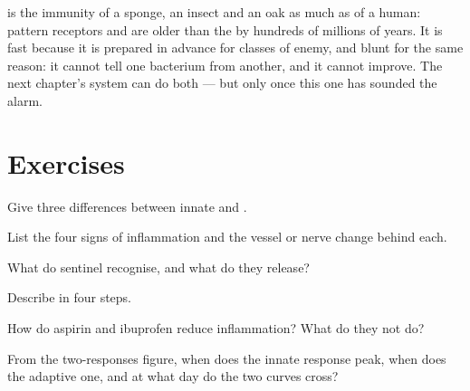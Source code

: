 \begin{remark}\label{rem:g12:innate-immunity:old}
 is the immunity of a sponge, an insect and an oak as
much as of a human: pattern receptors and  are older than
the  by hundreds of millions of years. It is fast because
it is prepared in advance for classes of enemy, and blunt for the
same reason: it cannot tell one bacterium from another, and it cannot
improve. The next chapter's system can do both --- but only once this
one has sounded the alarm.
\end{remark}

\section{Exercises}

\begin{exercise}[$\star$]\label{exo:g12:innate-immunity:1}
Give three differences between innate and .
\end{exercise}

\begin{exercise}[$\star$]\label{exo:g12:innate-immunity:2}
List the four signs of inflammation and the vessel or nerve change
behind each.
\end{exercise}

\begin{exercise}[$\star$]\label{exo:g12:innate-immunity:3}
What do sentinel  recognise, and what do they release?
\end{exercise}

\begin{exercise}[$\star$]\label{exo:g12:innate-immunity:4}
Describe  in four steps.
\end{exercise}

\begin{exercise}[$\star$]\label{exo:g12:innate-immunity:5}
How do aspirin and ibuprofen reduce inflammation? What do they not
do?
\end{exercise}

\begin{exercise}[$\star\star$]\label{exo:g12:innate-immunity:6}
From the two-responses figure, when does the innate response peak,
when does the adaptive one, and at what day do the two curves cross?
\end{exercise}

